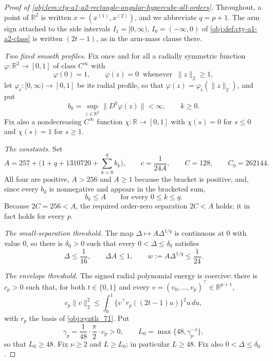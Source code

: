 \documentclass[11pt]{article}
\begin{document}
\begin{proof}[Proof of \cref{obj:lem:cty-a1-a2-rectangle-angular-hypercube-all-orders}]
Throughout, a point of \(\mathbb R^2\) is written \(x=(x^{(1)},x^{(2)})\), and we abbreviate \(q=p+1\).  The arm sign attached to the side intervals \(I_1=[0,\infty)\), \(I_0=(-\infty,0)\) of \cref{obj:def:cty-a1-a2-class} is written \((2t-1)\), as in the arm-mass clause there.

\emph{Two fixed smooth profiles.}
Fix once and for all a radially symmetric function \(\varphi:\mathbb R^2\to[0,1]\) of class \(C^\infty\) with
\[
\varphi(0)=1,
\qquad
\varphi(z)=0\ \text{ whenever }\ \lVert z\rVert_2\geq 1,
\]
let \(\varphi_{\mathrm r}:[0,\infty)\to[0,1]\) be its radial profile, so that \(\varphi(z)=\varphi_{\mathrm r}(\lVert z\rVert_2)\), and put
\[
b_k=\sup_{z\in\mathbb R^2}\lVert D^k\varphi(z)\rVert<\infty,
\qquad k\geq 0 .
\]
Fix also a nondecreasing \(C^\infty\) function \(\chi:\mathbb R\to[0,1]\) with \(\chi(s)=0\) for \(s\leq0\) and \(\chi(s)=1\) for \(s\geq1\).

\emph{The constants.}
Set
\[
A=257+\bigl(1+q+1310720+\sum_{k=0}^{q}b_k\bigr),
\qquad
c=\frac1{24A},
\qquad
C=128,
\qquad
C_0=262144 .
\]
All four are positive, \(A>256\) and \(A\geq1\) because the bracket is positive, and, since every \(b_k\) is nonnegative and appears in the bracketed sum,
\[
b_k\leq A
\qquad\text{for every }0\leq k\leq q .
\]
Because \(2C=256<A\), the required order-zero separation \(2C<A\) holds; it in fact holds for every \(p\).

\emph{The small-separation threshold.}
The map \(\Delta\mapsto A\Delta^{1/q}\) is continuous at \(0\) with value \(0\), so there is \(\delta_0>0\) such that every \(0<\Delta\leq\delta_0\) satisfies
\[
\Delta\leq\frac1{16},
\qquad
\Delta A\leq1,
\qquad
w:=A\Delta^{1/q}\leq\frac1{24}.
\]

\emph{The envelope threshold.}
The signed radial polynomial energy is coercive: there is \(c_p>0\) such that, for both \(t\in\{0,1\}\) and every \(v=(v_0,\ldots,v_p)^\top\in\mathbb R^{p+1}\),
\[
c_p\lVert v\rVert_2^2
\leq
\int_0^1\bigl\{v^\top r_p((2t-1)u)\bigr\}^2 u\,du ,
\]
with \(r_p\) the basis of \cref{obj:synth_71}.
Put
\[
\gamma_p=\frac1{48}\cdot\frac\pi2\cdot c_p>0,
\qquad
L_0=\max\{48,\gamma_p^{-1}\},
\]
so that \(L_0\geq48\).
Fix \(\nu\geq2\) and \(L\geq L_0\); in particular \(L\geq48\).  Fix also \(0<\Delta\leq\delta_0\).


\end{proof}
\end{document}
